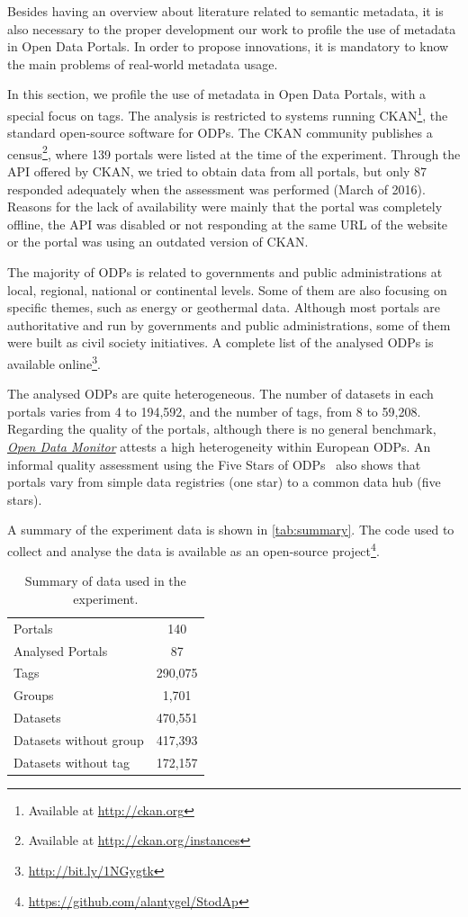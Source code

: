 Besides having an overview about literature related to semantic metadata, it is also necessary to the proper development our work to profile the use of metadata in Open Data Portals.
In order to propose innovations, it is mandatory to know the main problems of real-world metadata usage.

In this section, we profile the use of metadata in Open Data Portals, with a special focus on tags. 
The analysis is restricted to systems running CKAN\footnote{Available at \url{http://ckan.org}}, the standard open-source software for ODPs. 
The CKAN community publishes a census\footnote{Available at \url{http://ckan.org/instances}}, where 139 portals were listed at the time of the experiment. 
Through the API offered by CKAN, we tried to obtain data from all portals, but only 87 responded adequately when the assessment was performed (March of 2016).
Reasons for the lack of availability were mainly that the portal was completely offline, the API was disabled or not responding at the same URL of the website or the portal was using an outdated version of CKAN.

The majority of ODPs is related to governments and public administrations at local, regional, national or continental levels. 
Some of them are also focusing on specific themes, such as energy or geothermal data. 
Although most portals are authoritative and run by governments and public administrations, some of them were built as civil society initiatives.
A complete list of the analysed ODPs is available online\footnote{\url{http://bit.ly/1NGygtk}}.

	
The analysed ODPs are quite heterogeneous. 
The number of datasets in each portals varies from 4 to 194,592, and the number of tags, from 8 to 59,208.
Regarding the quality of the portals, although there is no general benchmark, \emph{\href{http://opendatamonitor.eu}{Open Data Monitor}} attests a high heterogeneity within European ODPs.
An informal quality assessment using the Five Stars of ODPs~\cite{Colpaert2013} also shows that portals vary from simple data registries (one star) to a common data hub (five stars).

A summary of the experiment data is shown in \autoref{tab:summary}. 
The code used to collect and analyse the data is available as an open-source project\footnote{\url{https://github.com/alantygel/StodAp}}.

\begin{table}[]
\centering
\ABNTEXfontereduzida
\caption{Summary of data used in the experiment.}
\label{tab:summary}
\begin{tabular}{l|c}
Portals & 140 \\
Analysed Portals & 87 \\
Tags & 290,075 \\
Groups & 1,701 \\
Datasets & 470,551 \\
Datasets without group & 417,393 \\
Datasets without tag & 172,157 \\
\end{tabular}
\end{table}


